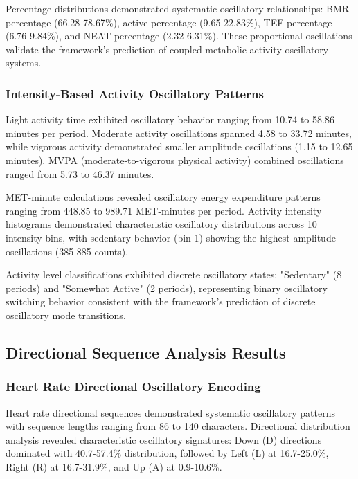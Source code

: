 Percentage distributions demonstrated systematic oscillatory relationships: BMR percentage (66.28-78.67\%), active percentage (9.65-22.83\%), TEF percentage (6.76-9.84\%), and NEAT percentage (2.32-6.31\%). These proportional oscillations validate the framework's prediction of coupled metabolic-activity oscillatory systems.

\subsubsection{Intensity-Based Activity Oscillatory Patterns}

Light activity time exhibited oscillatory behavior ranging from 10.74 to 58.86 minutes per period. Moderate activity oscillations spanned 4.58 to 33.72 minutes, while vigorous activity demonstrated smaller amplitude oscillations (1.15 to 12.65 minutes). MVPA (moderate-to-vigorous physical activity) combined oscillations ranged from 5.73 to 46.37 minutes.

MET-minute calculations revealed oscillatory energy expenditure patterns ranging from 448.85 to 989.71 MET-minutes per period. Activity intensity histograms demonstrated characteristic oscillatory distributions across 10 intensity bins, with sedentary behavior (bin 1) showing the highest amplitude oscillations (385-885 counts).

Activity level classifications exhibited discrete oscillatory states: "Sedentary" (8 periods) and "Somewhat Active" (2 periods), representing binary oscillatory switching behavior consistent with the framework's prediction of discrete oscillatory mode transitions.

\subsection{Directional Sequence Analysis Results}

\subsubsection{Heart Rate Directional Oscillatory Encoding}

Heart rate directional sequences demonstrated systematic oscillatory patterns with sequence lengths ranging from 86 to 140 characters. Directional distribution analysis revealed characteristic oscillatory signatures: Down (D) directions dominated with 40.7-57.4\% distribution, followed by Left (L) at 16.7-25.0\%, Right (R) at 16.7-31.9\%, and Up (A) at 0.9-10.6\%.

